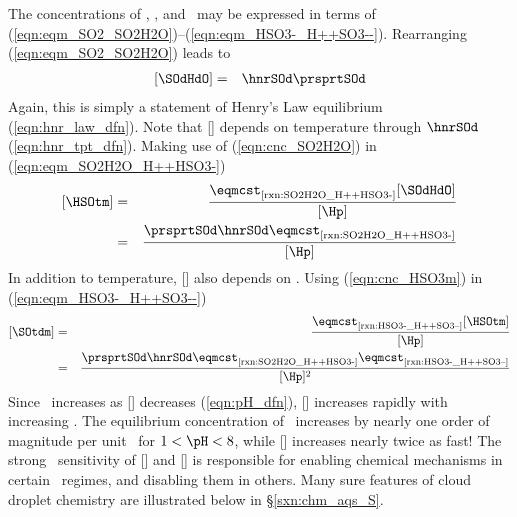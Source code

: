 \documentclass[12pt,twoside]{book}
\begin{document}
The concentrations of \SOdHdO, \HSOtm, and \SOtdm\ may be expressed in
terms of (\ref{eqn:eqm_SO2_SO2H2O})--(\ref{eqn:eqm_HSO3-_H++SO3--}).
Rearranging (\ref{eqn:eqm_SO2_SO2H2O}) leads to
\begin{eqnarray}
\label{eqn:cnc_SO2H2O}
[\SOdHdO] & = & \hnrSOd \prsprtSOd %
\end{eqnarray}
Again, this is simply a statement of Henry's Law equilibrium
(\ref{eqn:hnr_law_dfn}). 
Note that [\SOdHdO] depends on temperature through $\hnrSOd$
(\ref{eqn:hnr_tpt_dfn}). 
Making use of (\ref{eqn:cnc_SO2H2O}) in (\ref{eqn:eqm_SO2H2O_H++HSO3-})
\begin{eqnarray}
\label{eqn:cnc_HSO3m}
[\HSOtm] & = & \frac{\eqmcst_{\mbox{\scriptsize \ref{rxn:SO2H2O_H++HSO3-}}} [\SOdHdO]}{[\Hp] } \nonumber \\
& = & \frac{\prsprtSOd \hnrSOd \eqmcst_{\mbox{\scriptsize \ref{rxn:SO2H2O_H++HSO3-}}}}{[\Hp] } %
\end{eqnarray}
In addition to temperature, [\HSOtm] also depends on \pH\@.
Using (\ref{eqn:cnc_HSO3m}) in (\ref{eqn:eqm_HSO3-_H++SO3--}) 
\begin{eqnarray}
\label{eqn:cnc_SO3dm}
[\SOtdm] & = & \frac{\eqmcst_{\mbox{\scriptsize \ref{rxn:HSO3-_H++SO3--}}} [\HSOtm]}{[\Hp] } \nonumber \\ %
& = & \frac{\prsprtSOd \hnrSOd \eqmcst_{\mbox{\scriptsize \ref{rxn:SO2H2O_H++HSO3-}}} \eqmcst_{\mbox{\scriptsize \ref{rxn:HSO3-_H++SO3--}}}}{[\Hp]^{2} } %
\end{eqnarray}
Since \pH\ increases as [\Hp] decreases (\ref{eqn:pH_dfn}), [\SOtdm]
increases rapidly with increasing \pH\@. 
The equilibrium concentration of \HSOtm\ increases by nearly one order
of magnitude per unit \pH\ for $1 < \pH < 8$, while [\SOtdm] increases
nearly twice as fast!
The strong \pH\ sensitivity of [\HSOtm] and [\SOtdm] is responsible for
enabling chemical mechanisms in certain \pH\ regimes, and disabling them
in others. 
Many sure features of cloud droplet chemistry are illustrated below in
\S\ref{sxn:chm_aqs_S}.
\end{document}
